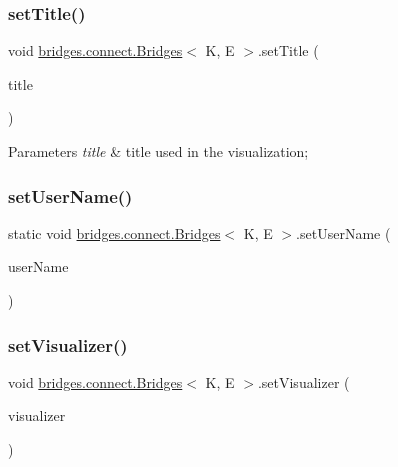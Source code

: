 \subsubsection{\texorpdfstring{set\+Title()}{setTitle()}}
{\footnotesize\ttfamily void \hyperlink{classbridges_1_1connect_1_1_bridges}{bridges.\+connect.\+Bridges}$<$ K, E $>$.set\+Title (\begin{DoxyParamCaption}\item[{String}]{title }\end{DoxyParamCaption})}


\begin{DoxyParams}{Parameters}
{\em title} & title used in the visualization; \\
\hline
\end{DoxyParams}
\hypertarget{classbridges_1_1connect_1_1_bridges_a2d84103645662308e58a1b473d3320ae}{}\label{classbridges_1_1connect_1_1_bridges_a2d84103645662308e58a1b473d3320ae} 
\subsubsection{\texorpdfstring{set\+User\+Name()}{setUserName()}}
{\footnotesize\ttfamily static void \hyperlink{classbridges_1_1connect_1_1_bridges}{bridges.\+connect.\+Bridges}$<$ K, E $>$.set\+User\+Name (\begin{DoxyParamCaption}\item[{String}]{user\+Name }\end{DoxyParamCaption})\hspace{0.3cm}{\ttfamily [static]}}

\hypertarget{classbridges_1_1connect_1_1_bridges_ad627f604914734646e92fac9e7b385d8}{}\label{classbridges_1_1connect_1_1_bridges_ad627f604914734646e92fac9e7b385d8} 
\subsubsection{\texorpdfstring{set\+Visualizer()}{setVisualizer()}}
{\footnotesize\ttfamily void \hyperlink{classbridges_1_1connect_1_1_bridges}{bridges.\+connect.\+Bridges}$<$ K, E $>$.set\+Visualizer (\begin{DoxyParamCaption}\item[{\hyperlink{classbridges_1_1base_1_1_a_d_t_visualizer}{A\+D\+T\+Visualizer}$<$ K, E $>$}]{visualizer }\end{DoxyParamCaption})}

